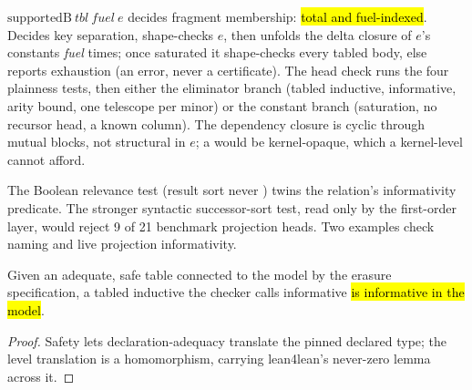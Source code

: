 \begin{definition}
\label{def:supportedB}
\leanok
{}
 $\mathrm{supportedB}\ tbl\ \mathit{fuel}\ e$ decides fragment membership: \hl{total
and fuel-indexed}. Decides key separation, shape-checks $e$, then unfolds the delta closure of
$e$'s constants \emph{fuel} times; once saturated it shape-checks every tabled body, else reports
exhaustion (an error, never a certificate). The head check runs the four plainness tests, then
either the eliminator branch (tabled inductive, informative, arity bound, one telescope per minor)
or the constant branch (saturation, no recursor head, a known column).
 The dependency closure is cyclic through mutual blocks, not structural in $e$; a
 would be kernel-opaque, which a kernel-level  cannot afford.
\end{definition}

\begin{remark}
 The Boolean relevance test (result sort never ) twins the relation's
informativity predicate. The stronger syntactic successor-sort test, read only by the first-order
layer, would reject 9 of 21 benchmark projection heads. Two  examples check
 naming and live projection informativity.
\end{remark}

\begin{lemma}
\label{lem:informativeInd_of_tabled}
\leanok
{}
 Given an adequate, safe table connected to the model by the erasure specification,
a tabled inductive the checker calls informative \hl{is informative in the model}.
\end{lemma}
\begin{proof}
\leanok
{}
 Safety lets declaration-adequacy translate the pinned declared type; the level
translation is a homomorphism, carrying lean4lean's never-zero lemma across it.
\end{proof}

